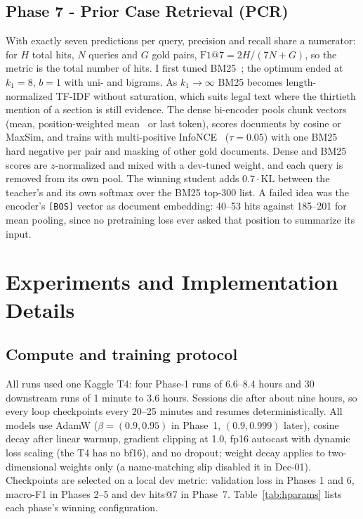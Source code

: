 \documentclass[11pt, oneside]{article}
\begin{document}
\subsection{Phase 7 - Prior Case Retrieval (PCR)}
\vspace{-5pt}
With exactly seven predictions per query, precision and recall share a numerator: for $H$ total hits, $N$ queries and $G$ gold pairs, $\text{F1@7}=2H/(7N+G)$, so the metric is the total number of hits. I first tuned BM25~\cite{robertson2009bm25}; the optimum ended at $k_1=8$, $b=1$ with uni- and bigrams. As $k_1\to\infty$ BM25 becomes length-normalized TF-IDF without saturation, which suits legal text where the thirtieth mention of a section is still evidence. The dense bi-encoder pools chunk vectors (mean, position-weighted mean~\cite{muennighoff2022sgpt} or last token), scores documents by cosine or MaxSim, and trains with multi-positive InfoNCE~\cite{oord2018cpc} ($\tau=0.05$) with one BM25 hard negative per pair and masking of other gold documents. Dense and BM25 scores are $z$-normalized and mixed with a dev-tuned weight, and each query is removed from its own pool. The winning student adds $0.7\cdot\mathrm{KL}$ between the teacher's and its own softmax over the BM25 top-300 list. A failed idea was the encoder's \texttt{[BOS]} vector as document embedding: 40--53 hits against 185--201 for mean pooling, since no pretraining loss ever asked that position to summarize its input.

\section{Experiments and Implementation Details}
\subsection{Compute and training protocol}
All runs used one Kaggle T4: four Phase-1 runs of 6.6--8.4 hours and 30 downstream runs of 1 minute to 3.6 hours. Sessions die after about nine hours, so every loop checkpoints every 20--25 minutes and resumes deterministically. All models use AdamW ($\beta=(0.9,0.95)$ in Phase~1, $(0.9,0.999)$ later), cosine decay after linear warmup, gradient clipping at 1.0, fp16 autocast with dynamic loss scaling (the T4 has no bf16), and no dropout; weight decay applies to two-dimensional weights only (a name-matching slip disabled it in Dec-01). Checkpoints are selected on a local dev metric: validation loss in Phases 1 and 6, macro-F1 in Phases 2--5 and dev hits@7 in Phase~7. Table~\ref{tab:hparams} lists each phase's winning configuration.
\end{document}
